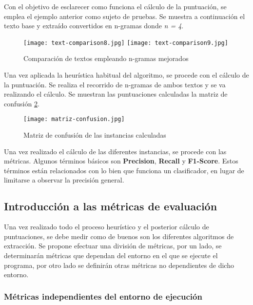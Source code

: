 Con el objetivo de esclarecer como funciona el cálculo de la puntuación, se emplea el ejemplo anterior
como sujeto de pruebas. Se muestra a continuación el texto base y extraído convertidos en n-gramas donde 
\emph{n = 4}.

\begin{figure}[tphb]
  \centering
  \texttt{[image: text-comparison8.jpg]}
  \texttt{[image: text-comparison9.jpg]}
  \caption{Comparación de textos empleando n-gramas mejorados}
  \label{img:comparacion de textos empleando n-gramas mejorados}
\end{figure}

Una vez aplicada la heurística habitual del algoritmo, se procede con el cálculo de la puntuación. Se
realiza el recorrido de n-gramas de ambos textos y se va realizando el cálculo. Se muestran las puntuaciones 
calculadas la matriz de confusión \ref{img:matriz de confusion de las instancias calculadas}.

\begin{figure}[tphb]
  \centering
  \texttt{[image: matriz-confusion.jpg]}
  \caption{Matriz de confusión de las instancias calculadas}
  \label{img:matriz de confusion de las instancias calculadas}
\end{figure}

Una vez realizado el cálculo de las diferentes instancias, se procede con las métricas. Algunos términos 
básicos son \textbf{Precision}, \textbf{Recall} y \textbf{F1-Score}. Estos términos están relacionados con 
lo bien que funciona un clasificador, en lugar de limitarse a observar la precisión general.

\subsection{Introducción a las métricas de evaluación}
\label{subsec:introduccion a las metricas de evaluacion}

Una vez realizado todo el proceso heurístico y el posterior cálculo de puntuaciones, se debe medir como de
buenos son los diferentes algoritmos de extracción. Se propone efectuar una división de métricas, por un
lado, se determinarán métricas que dependan del entorno en el que se ejecute el programa, por otro lado
se definirán otras métricas no dependientes de dicho entorno.

\subsubsection{Métricas independientes del entorno de ejecución}
\label{subsubsec:metricas independientes del entorno de ejecucion}

